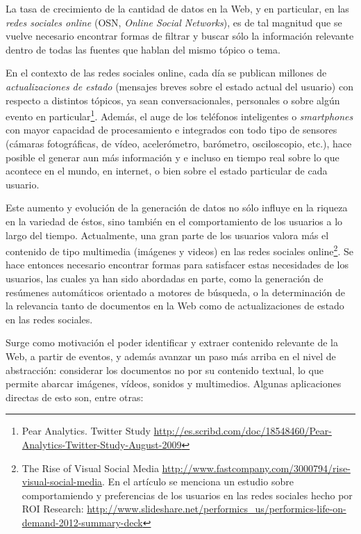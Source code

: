 \documentclass[upright, contnum]{umemoria}
\begin{document}
   
   La tasa de crecimiento de la cantidad de datos en la Web, y en
   particular, en las \emph{redes sociales online} (OSN, \emph{Online Social Networks}),
   es de tal magnitud que se vuelve necesario encontrar formas de
   filtrar y buscar sólo la información relevante dentro de todas las
   fuentes que hablan del mismo tópico o tema.

   En el contexto de las redes sociales online, cada día se publican
   millones de \emph{actualizaciones de estado} (mensajes breves sobre el
   estado actual del usuario) con respecto a distintos tópicos, ya
   sean conversacionales, personales o sobre algún evento en
   particular\footnote{Pear Analytics. Twitter Study \href{http://es.scribd.com/doc/18548460/Pear-Analytics-Twitter-Study-August-2009}{http://es.scribd.com/doc/18548460/Pear-Analytics-Twitter-Study-August-2009} }.
   Además, el auge de los teléfonos inteligentes o \emph{smartphones} con mayor
   capacidad de procesamiento e integrados con todo tipo de sensores
   (cámaras fotográficas, de vídeo, acelerómetro, barómetro,
   osciloscopio, etc.), hace posible el generar aun más información y
   e incluso en tiempo real sobre lo que acontece en el mundo, en
   internet, o bien sobre el estado particular de cada usuario.

   Este aumento y evolución de la generación de datos no sólo influye en la
   riqueza en la variedad de éstos, sino también en el
   comportamiento de los usuarios a lo largo del tiempo. Actualmente,
   una gran parte de los usuarios valora más el contenido de tipo
   multimedia (imágenes y videos) en las redes sociales online\footnote{The Rise of Visual Social Media \href{http://www.fastcompany.com/3000794/rise-visual-social-media}{http://www.fastcompany.com/3000794/rise-visual-social-media}. En el   artículo se menciona un estudio sobre comportamiendo y preferencias de los usuarios en las redes sociales hecho por ROI Research: \href{http://www.slideshare.net/performics_us/performics-life-on-demand-2012-summary-deck}{http://www.slideshare.net/performics\_us/performics-life-on-demand-2012-summary-deck} }. 
   Se hace entonces necesario encontrar formas para satisfacer estas
   necesidades de los usuarios, las cuales ya han sido
   abordadas en parte, como la generación de
   resúmenes automáticos orientado a motores de búsqueda, o la
   determinación de la relevancia tanto de documentos en la Web como de
   actualizaciones de estado en las redes sociales.

   Surge como motivación el poder identificar y extraer contenido
   relevante de la Web, a partir de eventos, y además avanzar un
   paso más arriba en el nivel de abstracción: considerar los
   documentos no por su contenido textual, lo que permite abarcar
   imágenes, vídeos, sonidos y multimedios. Algunas
   aplicaciones directas de esto son, entre otras:
\end{document}
